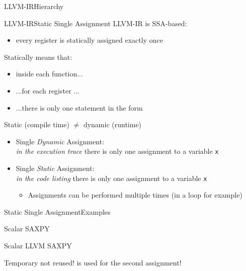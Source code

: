 \begin{frame}{LLVM-IR}{Hierarchy}
\centering
\\
\end{frame}


\begin{frame}{LLVM-IR}{Static Single Assignment}
LLVM-IR is SSA-based:

\begin{itemize}
\item every register is \alert{statically assigned} exactly \alert{once}
\end{itemize}
\bigskip
Statically means that:

\begin{itemize}
\item inside each function...
\item ...for each register ...
\item ...there is \alert{only one} statement in the form 
\end{itemize}
\bigskip
\alert{Static} (compile time) $\neq$ \alert{dynamic} (runtime)
{\footnotesize
\begin{itemize}
\item Single \emph{Dynamic} Assignment:\\\emph{in the execution trace} there is only one assignment to a variable \texttt{x}
\item Single \emph{Static} Assignment:\\\emph{in the code listing} there is only one assignment to a variable \texttt{x}
\begin{itemize}
\scriptsize
\item Assignments \alert{can} be performed multiple times (in a loop for example)
\end{itemize}
\end{itemize}
}
\end{frame}


\begin{frame}{Static Single Assignment}{Examples}
\begin{block}{Scalar SAXPY}
\end{block}

\begin{block}{Scalar LLVM SAXPY}
\end{block}

Temporary  not reused!  is used for the second
assignment!
\end{frame}


